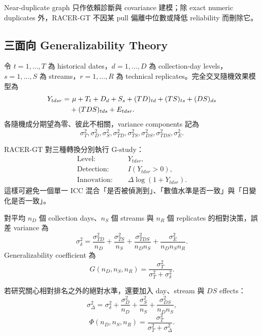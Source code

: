 \documentclass[12pt,a4paper,oneside]{article}
\begin{document}
Near-duplicate graph 只作依賴診斷與 covariance 建模；除 exact numeric duplicates 外，RACER-GT 不因某 pull 偏離中位數或降低 reliability 而刪除它。

\subsection{三面向 Generalizability Theory}

令 $t=1,\ldots,T$ 為 historical dates，$d=1,\ldots,D$ 為 collection-day levels，$s=1,\ldots,S$ 為 streams，$r=1,\ldots,R$ 為 technical replicates。完全交叉隨機效果模型為
\begin{align}
Y_{tdsr}
=&\ \mu+T_t+D_d+S_s+(TD)_{td}+(TS)_{ts}+(DS)_{ds}\notag\\
&+(TDS)_{tds}+E_{tdsr}.
\label{eq:gtheorymodel}
\end{align}
各隨機成分期望為零、彼此不相關，variance components 記為
\[
\sigma_T^2,\sigma_D^2,\sigma_S^2,\sigma_{TD}^2,
\sigma_{TS}^2,\sigma_{DS}^2,\sigma_{TDS}^2,\sigma_E^2.
\]

RACER-GT 對三種轉換分別執行 G-study：
\begin{align}
\text{Level: }&\quad Y_{tdsr},\\
\text{Detection: }&\quad I(Y_{tdsr}>0),\\
\text{Innovation: }&\quad \Delta\log(1+Y_{tdsr}).
\end{align}
這樣可避免一個單一 ICC 混合「是否被偵測到」、「數值水準是否一致」與「日變化是否一致」。

對平均 $n_D$ 個 collection days、$n_S$ 個 streams 與 $n_R$ 個 replicates 的相對決策，誤差 variance 為
\begin{equation}
\sigma_\delta^2
=\frac{\sigma_{TD}^2}{n_D}
+\frac{\sigma_{TS}^2}{n_S}
+\frac{\sigma_{TDS}^2}{n_Dn_S}
+\frac{\sigma_E^2}{n_Dn_Sn_R}.
\label{eq:relativeerror}
\end{equation}
Generalizability coefficient 為
\begin{equation}
G(n_D,n_S,n_R)
=\frac{\sigma_T^2}{\sigma_T^2+\sigma_\delta^2}.
\label{eq:gcoef}
\end{equation}

若研究關心相對排名之外的絕對水準，還要加入 day、stream 與 $DS$ effects：
\begin{equation}
\sigma_\Delta^2=\sigma_\delta^2
+\frac{\sigma_D^2}{n_D}
+\frac{\sigma_S^2}{n_S}
+\frac{\sigma_{DS}^2}{n_Dn_S},
\end{equation}
\begin{equation}
\Phi(n_D,n_S,n_R)
=\frac{\sigma_T^2}{\sigma_T^2+\sigma_\Delta^2}.
\label{eq:phicoef}
\end{equation}
\end{document}
